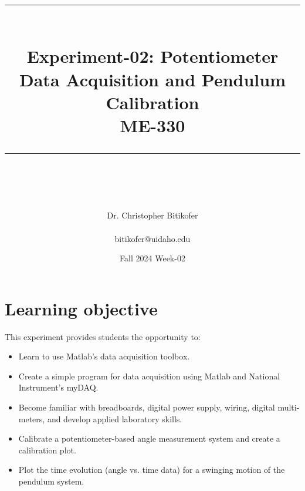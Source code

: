 \documentclass{article} %
\newcommand{\HRule}{\rule{\linewidth}{0.5mm}} %
\begin{document}


\title{
\begin{center}
\HRule \\[0.4cm]
{\Huge \bfseries Experiment-02: Potentiometer Data Acquisition and Pendulum Calibration \\[0.5cm] \Large ME-330}\\[0.4cm] %
\HRule \\[1.5cm]
\end{center}
}
\author{\Huge Dr. Christopher Bitikofer \\ \\ \LARGE bitikofer@uidaho.edu \\[2cm]} %
\date{Fall 2024 Week-02} %
\maketitle

\tableofcontents

\clearpage

\section{Learning objective}
This experiment provides students the opportunity to:

\begin{itemize}
\item Learn to use Matlab's data acquisition toolbox.
\item Create a simple program for data acquisition using Matlab and National Instrument’s myDAQ.
\item Become familiar with breadboards, digital power supply, wiring, digital multi-meters, and develop applied laboratory skills.
\item Calibrate a potentiometer-based angle measurement system and create a calibration plot.
\item Plot the time evolution (angle vs. time data) for a swinging motion of the pendulum system.
\end{itemize}
\end{document}
